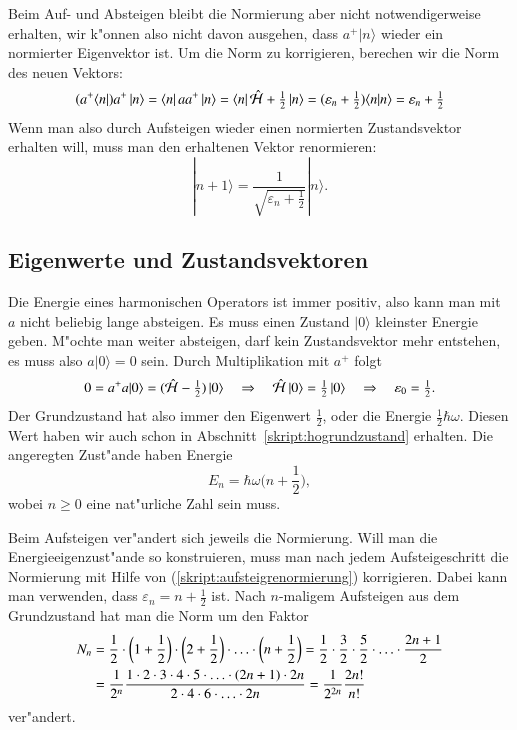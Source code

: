 Beim Auf- und Absteigen bleibt die Normierung aber nicht notwendigerweise
erhalten, wir k"onnen also nicht davon ausgehen, dass $a^+|n\rangle$
wieder ein normierter Eigenvektor ist.
%
Um die Norm zu korrigieren, berechen wir die Norm des neuen Vektors:
\[
(a^+\langle n|) a^+\,|n\rangle
=
\langle n|\,aa^+\,|n\rangle
=
\langle n|\,\hat{\cal H}+{\textstyle\frac12}\,|n\rangle
=
(\varepsilon_n+{\textstyle\frac12})\langle n|n\rangle
=
\varepsilon_n+\textstyle\frac12
\]
Wenn man also durch Aufsteigen wieder einen normierten Zustandsvektor
erhalten will, muss man den erhaltenen Vektor renormieren:
\begin{equation}
|n+1\rangle = \frac1{\sqrt{\varepsilon_n+\textstyle\frac12}}|n\rangle.
\label{skript:aufsteigrenormierung}
\end{equation}

\subsection{Eigenwerte und Zustandsvektoren}
Die Energie eines harmonischen Operators ist immer positiv,
also kann man mit $a$ nicht beliebig lange absteigen. Es muss einen
Zustand $|0\rangle$ kleinster Energie geben. M"ochte man weiter
absteigen, darf kein Zustandsvektor mehr entstehen, es muss also
$a|0\rangle=0$ sein. Durch Multiplikation mit $a^+$ folgt
\[
0=a^+a|0\rangle=(\hat{\cal H}-\textstyle\frac12)\,|0\rangle
\quad
\Rightarrow
\quad
\hat{\cal H}\,|0\rangle=\frac12\,|0\rangle
\quad
\Rightarrow
\quad
\varepsilon_0=\frac12.
\]
Der Grundzustand hat also immer den Eigenwert $\frac12$, oder die
Energie $\frac12\hbar\omega$. Diesen Wert haben wir auch schon in
Abschnitt~\ref{skript:hogrundzustand} erhalten.
Die angeregten Zust"ande haben Energie
\[
E_n
=
\hbar\omega\biggl(n+\frac12\biggr),
\]
wobei $n\ge 0$ eine nat"urliche Zahl sein muss.

Beim Aufsteigen ver"andert sich jeweils die Normierung.
Will man die Energieeigenzust"ande so konstruieren, muss man nach jedem
Aufsteigeschritt die Normierung mit Hilfe von (\ref{skript:aufsteigrenormierung})
korrigieren. Dabei kann man verwenden, dass $\varepsilon_n = n+\frac12$
ist. Nach $n$-maligem Aufsteigen aus dem Grundzustand hat man die
Norm um den Faktor
\begin{align}
N_n
&=
\frac12\cdot\biggl(1+\frac12\biggr)\cdot\biggl(2+\frac12\biggr)\cdot\ldots\cdot
\biggl(n+\frac12\biggr)
=
\frac12\cdot\frac32\cdot\frac52\cdot\ldots\cdot\frac{2n+1}2
\notag
\\
&=
\frac1{2^n}
\frac{1\cdot 2\cdot 3\cdot 4\cdot 5\cdot \ldots \cdot (2n+1)\cdot 2n}%
{2\cdot 4\cdot 6\cdot \ldots \cdot 2n}
=\frac1{2^{2n}}\frac{2n!}{n!}
\label{skript:aufsteigrenormierungn}
\end{align}
ver"andert.

